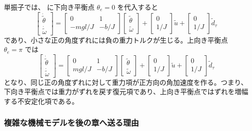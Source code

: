 単振子では、 に下向き平衡点 $\theta_e=0$ を代入すると
\begin{equation}
  \begin{bmatrix}
    \dot{\tilde{\theta}}\\
    \dot{\tilde{\omega}}
  \end{bmatrix}
  =
  \begin{bmatrix}
    0&1\\
    -mgl/J&-b/J
  \end{bmatrix}
  \begin{bmatrix}
    \tilde{\theta}\\
    \tilde{\omega}
  \end{bmatrix}
  +\begin{bmatrix}0\\1/J\end{bmatrix}\tilde{u}
  +\begin{bmatrix}0\\1/J\end{bmatrix}\tilde{d}_\tau
\end{equation}
であり、小さな正の角度ずれには負の重力トルクが生じる。上向き平衡点 $\theta_e=\pi$ では
\begin{equation}
  \begin{bmatrix}
    \dot{\tilde{\theta}}\\
    \dot{\tilde{\omega}}
  \end{bmatrix}
  =
  \begin{bmatrix}
    0&1\\
    mgl/J&-b/J
  \end{bmatrix}
  \begin{bmatrix}
    \tilde{\theta}\\
    \tilde{\omega}
  \end{bmatrix}
  +\begin{bmatrix}0\\1/J\end{bmatrix}\tilde{u}
  +\begin{bmatrix}0\\1/J\end{bmatrix}\tilde{d}_\tau
\end{equation}
となり、同じ正の角度ずれに対して重力項が正方向の角加速度を作る。つまり、下向き平衡点では重力がずれを戻す復元項であり、上向き平衡点ではずれを増幅する不安定化項である。

\subsubsection{複雑な機械モデルを後の章へ送る理由}

